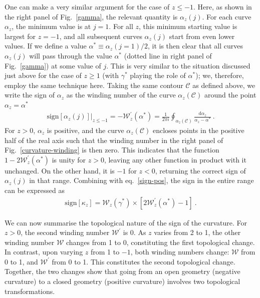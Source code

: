 One can make a very similar argument for the case of \(z \leq -1\). Here, as shown in the right panel of Fig.~\ref{gamma}, the relevant quantity is \(\alpha_z(j)\). For each curve \(\alpha_z\), the minimum value is at \(j=1\). For all \(z\), this minimum starting value is largest for \(z=-1\), and all subsequent curves \(\alpha_z(j)\) start from even lower values. If we define a value \(\alpha^* \equiv \alpha_z(j=1)/2\), it is then clear that all curves \(\alpha_z(j)\) will pass through the value \(\alpha^*\) (dotted line in right panel of Fig.~\ref{gamma}) at some value of \(j\).
This is very similar to the situation discussed just above for the case of \(z \geq 1\) (with \(\gamma^*\) playing the role of \(\alpha^*\)); we, therefore, employ the same technique here.
Taking the same contour \(\mathcal{C}\) as defined above, we write the sign of \(\alpha_z\) as the winding number of the curve \(\alpha_z(\mathcal{C})\) around the point \(\alpha_z = \alpha^* \)
\begin{equation}\begin{aligned}
	\text{sign}\left[\alpha_z(j)\right] \bigg\vert_{z \leq -1} = -\mathcal{W}^\prime_z(\alpha^*) = \frac{1}{2\pi i}\oint_{\alpha_z(\mathcal{C})}  \frac{\mathrm{d}\alpha_z}{\alpha_z - \alpha^*}~.
\end{aligned}\end{equation}
For \(z>0\), \(\alpha_z\) is positive, and the curve \(\alpha_z(\mathcal{C})\) encloses points in the positive half of the real axis such that the winding number in the right panel of Fig.~\ref{curvature-winding} is then zero. This indicates that the function \(1 - 2\mathcal{W}_z^\prime(\alpha^*)\) is unity for \(z > 0\), leaving any other function in product with it unchanged. On the other hand, it is \(-1\) for \(z < 0\), returning the correct sign of \(\alpha_z(j)\) in that range. Combining with eq.~\eqref{sign-pos}, the sign in the entire range can be expressed as
\begin{equation}\begin{aligned}
	\text{sign}\left[\kappa_z\right] = \mathcal{W}_z\left( \gamma^* \right) \times \left[2\mathcal{W}^\prime_z\left( \alpha^* \right) - 1\right]~. 
	\label{topo-kappa}
\end{aligned}\end{equation}

We can now summarise the topological nature of the sign of the curvature. For \(z>0\), the second winding number \(\mathcal{W}^\prime \) is 0. As \(z\) varies from 2 to 1, the other winding number \(\mathcal{W}\) changes from 1 to 0, constituting the first topological change. In contrast, upon varying \(z\) from 1 to \(-1\), both winding numbers change: \(\mathcal{W}\) from 0 to 1, and \(\mathcal{W}^\prime\) from 0 to 1. This constitutes the second topological change. Together, the two changes show that going from an open geometry (negative curvature) to a closed geometry (positive curvature) involves two topological transformations.


